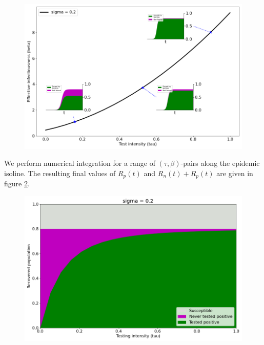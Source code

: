 \documentclass[10pt,a4paper]{article}
\begin{document}
\begin{figure}[h]\centering
    \includegraphics[width = \linewidth]{./../Figures/TestingModelling_IsolineExamples.png}
    \caption{ }\label{fig:IsolineExamples}
\end{figure}

We perform numerical integration for a range of $(\tau,\beta)$-pairs along the epidemic isoline. The resulting final values of $R_p(t)$ and $R_n(t)+R_p(t)$ are given in figure \ref{fig:AlongIsoline}.

\begin{figure}[h]\centering
    \includegraphics[width = \linewidth]{./../Figures/TestingModelling_AlongIsoline.png}
    \caption{ }\label{fig:AlongIsoline}
\end{figure}
\end{document}
